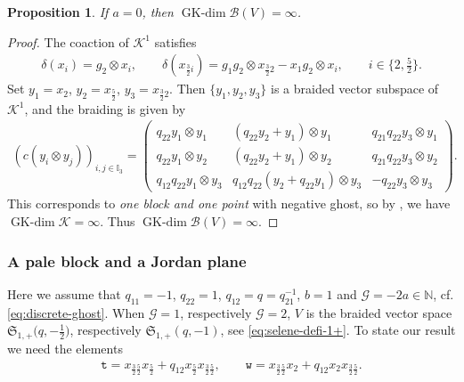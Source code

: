 \documentclass[pdftex]{sigma}
\numberwithin{equation}{section}
\newtheorem{Proposition}[Theorem]{Proposition}
 { \theoremstyle{definition}
\newtheorem{Definition}[Theorem]{Definition}
\newtheorem{Note}[Theorem]{Note}
\newtheorem{Example}[Theorem]{Example}
\newtheorem{Remark}[Theorem]{Remark} }
\newcommand{\GK}{\operatorname{GK-dim}}
\newcommand{\toba}{\mathscr B}
\newcommand{\ghost}{\mathscr{G}}
\newcommand{\K}{{\mathcal{K}}}
\newcommand{\sele}{\mathfrak{S}}
\newcommand{\I}{{\mathbb I}}
\newcommand{\N}{{\mathbb N}}
\newcommand{\ttt}{\mathtt{t}}
\newcommand{\wt}{\mathtt{w}}
\newcommand{\tresdos}{\frac{3}{2}}
\newcommand{\cincodos}{\frac{5}{2}}
\begin{document}
\begin{Proposition}\label{prop:pale+Jordan-discarding}
If $a=0$, then $\GK \toba(V)=\infty$.
\end{Proposition}

\begin{proof}
The coaction of $\mathcal{K}^1$ satisfies
\begin{align*}
\delta(x_i) = g_2 \otimes x_i,\qquad
\delta(x_{\tresdos i}) = g_1g_2 \otimes x_{\tresdos2} - x_1g_2 \otimes x_i,\qquad
 i\in\big\{2,\tfrac{5}{2}\big\}.
\end{align*}
Set $y_1=x_2$, $y_2=x_{\cincodos}$, $y_3=x_{\tresdos2}$. Then $\{y_1, y_2, y_3\}$ is a braided vector subspace of $\K^1$, and the braiding is given by
\begin{align*}
(c(y_i \otimes y_j))_{i,j\in\I_3}=\begin{pmatrix}
q_{22} y_1 \otimes y_1& (q_{22} y_2 + y_1) \otimes y_1 & q_{21}q_{22} y_3 \otimes y_1
\\
q_{22} y_1 \otimes y_2 & (q_{22} y_2 + y_1) \otimes y_2 & q_{21}q_{22} y_3 \otimes y_2
\\
q_{12}q_{22} y_1 \otimes y_3 & q_{12}q_{22} (y_2 + q_{22}y_1) \otimes y_3 & -q_{22} y_3 \otimes y_3
\end{pmatrix}\!.
\end{align*}
This corresponds to \emph{one block and one point} with negative ghost, so by \cite[Theorem~4.1.1]{AAH-triang},
we have $\GK \K=\infty$.
Thus $\GK \toba(V)=\infty$.
\end{proof}



\subsubsection{A pale block and a Jordan plane}\label{subsubsec:pale-jordan}
Here we assume that $q_{11} = -1$, $q_{22}=1$, $q_{12} = q = q_{21}^{-1}$, $b=1$ and $\ghost =-2a \in \N$, cf. \eqref{eq:discrete-ghost}.
When $\ghost= 1$, respectively $\ghost=2$, $V$
is the braided vector space $\sele_{1,+}\big(q, -\frac12\big)$, respectively $\sele_{1,+}(q,-1)$, see \eqref{eq:selene-defi-1+}.
To state our result we need the elements
\begin{align}\label{eq:pale-Jordan-def-w-t}
\ttt= x_{\tresdos\cincodos}x_{\cincodos}+q_{12}x_{\cincodos}x_{\tresdos\cincodos},\qquad
\wt= x_{\tresdos\cincodos}x_{2}+q_{12}x_{2}x_{\tresdos\cincodos}.
\end{align}
\end{document}
